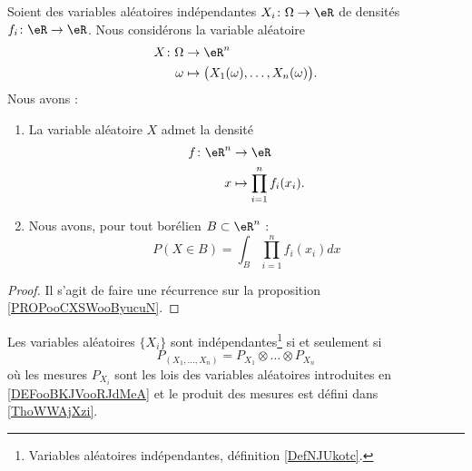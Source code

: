 \begin{proposition}	\label{PROPooANJQooPjBPSy}
	Soient des variables aléatoires indépendantes \(X_i \colon \Omega\to \eR  \) de densités \(f_i \colon \eR\to \eR  \). Nous considérons la variable aléatoire
	\begin{equation}
		\begin{aligned}
			X\colon \Omega & \to \eR^n                                           \\
			\omega         & \mapsto \big( X_1(\omega),\ldots,X_n(\omega) \big).
		\end{aligned}
	\end{equation}
	Nous avons :
	\begin{enumerate}
		\item
		      La variable aléatoire \( X\) admet la densité
		      \begin{equation}
			      \begin{aligned}
				      f\colon \eR^n & \to \eR                        \\
				      x             & \mapsto \prod_{i=1}^nf_i(x_i).
			      \end{aligned}
		      \end{equation}
		\item		\label{ITEMooNIMQooGqFKNn}
		      Nous avons, pour tout borélien \( B\subset \eR^n\) :
		      \begin{equation}
			      P(X\in B)=\int_B\prod_{i=1}^nf_i(x_i)dx
		      \end{equation}
	\end{enumerate}
\end{proposition}

\begin{proof}
	Il s'agit de faire une récurrence sur la proposition \ref{PROPooCXSWooByucuN}.
\end{proof}


\begin{proposition}     \label{PropPXXXPXPXPX}
	Les variables aléatoires \( \{ X_i \}\) sont indépendantes\footnote{Variables aléatoires indépendantes, définition \ref{DefNJUkotc}.} si et seulement si
	\begin{equation}
		P_{(X_1,\ldots,X_n)}=P_{X_1}\otimes\ldots\otimes P_{X_n}
	\end{equation}
	où les mesures \( P_{X_i}\) sont les lois des variables aléatoires introduites en \ref{DEFooBKJVooRJdMeA} et le produit des mesures est défini dans \ref{ThoWWAjXzi}.
\end{proposition}

